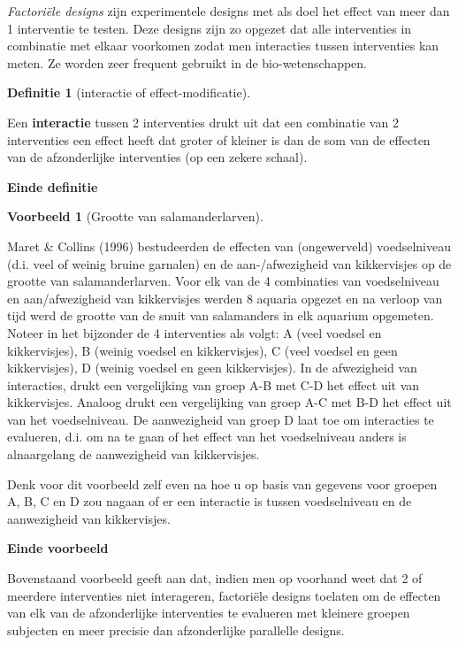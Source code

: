 \documentclass[
  12pt,dutch]{book}
\theoremstyle{definition}
\newtheorem{definition}{Definitie}[chapter]
\theoremstyle{definition}
\newtheorem{example}{Voorbeeld}[chapter]
\theoremstyle{definition}
\theoremstyle{definition}
\theoremstyle{remark}
\begin{document}
\emph{Factoriële designs} zijn experimentele designs met als doel het effect van
meer dan 1 interventie te testen. Deze designs zijn zo opgezet dat alle interventies in combinatie met elkaar voorkomen zodat men interacties
tussen interventies kan meten. Ze worden zeer frequent gebruikt in de bio-wetenschappen.

\begin{definition}[interactie of effect-modificatie]
\protect\hypertarget{def:unnamed-chunk-78}{}\label{def:unnamed-chunk-78}~
\end{definition}

Een \textbf{interactie} tussen 2 interventies drukt uit dat een combinatie
van 2 interventies een effect heeft dat groter of kleiner is dan de som van
de effecten van de afzonderlijke interventies (op een zekere schaal).

\textbf{Einde definitie}

\begin{example}[Grootte van salamanderlarven]
\protect\hypertarget{exm:unnamed-chunk-79}{}\label{exm:unnamed-chunk-79}~
\end{example}

Maret \& Collins (1996) bestudeerden de effecten van (ongewerveld) voedselniveau (d.i. veel of weinig bruine garnalen) en de aan-/afwezigheid van kikkervisjes op de grootte van salamanderlarven. Voor elk van de 4 combinaties van voedselniveau en aan/afwezigheid van kikkervisjes werden 8 aquaria opgezet en na verloop van tijd werd de grootte van de snuit van salamanders in elk aquarium opgemeten. Noteer in het bijzonder de 4 interventies als volgt: A (veel voedsel en kikkervisjes), B (weinig voedsel en kikkervisjes), C (veel voedsel en geen kikkervisjes), D (weinig voedsel en geen kikkervisjes).
In de afwezigheid van interacties, drukt een vergelijking van groep A-B met C-D het effect uit
van kikkervisjes. Analoog drukt een vergelijking van groep A-C met B-D
het effect uit van het voedselniveau. De aanwezigheid van groep D laat toe om
interacties te evalueren, d.i. om na te gaan of het effect van het voedselniveau anders is alnaargelang de aanwezigheid van kikkervisjes.

Denk voor dit voorbeeld zelf even na hoe u op basis van gegevens voor
groepen A, B, C en D zou nagaan of er een interactie is tussen voedselniveau en
de aanwezigheid van kikkervisjes.

\textbf{Einde voorbeeld}

Bovenstaand voorbeeld geeft aan dat, indien men op voorhand weet dat 2 of meerdere interventies niet
interageren, factoriële designs toelaten om de effecten van elk van de
afzonderlijke interventies te evalueren met kleinere groepen subjecten en
meer precisie dan afzonderlijke parallelle designs.
\end{document}
